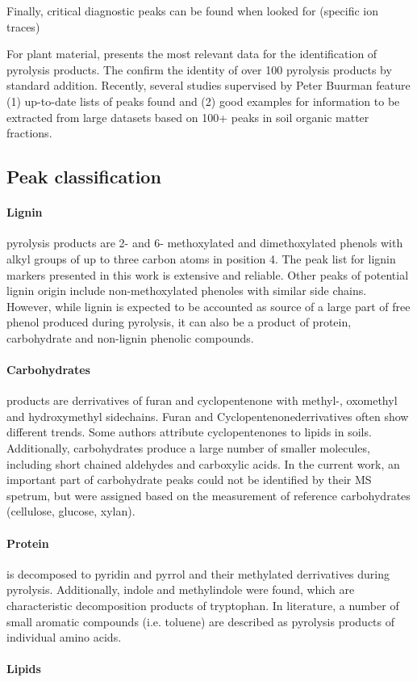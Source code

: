 Finally, critical diagnostic peaks can be found when looked for (specific ion traces)

For plant material, \cite{Ralph1991} presents the most relevant data for the identification of pyrolysis products. The confirm the identity of over 100 pyrolysis products by standard addition. Recently, several studies supervised by Peter Buurman \citep{Schellekens2009,Buurman2010, Vancampenhout2009 } feature (1) up-to-date lists of peaks found and (2) good examples for information to be extracted from large datasets based on 100+ peaks in soil organic matter fractions.

\subsection{Peak classification}

\paragraph{Lignin} pyrolysis products are 2- and 6- methoxylated and dimethoxylated phenols with alkyl groups of up to three carbon atoms in position 4. The peak list for lignin markers presented in this work is extensive and reliable. Other peaks of potential lignin origin include non-methoxylated phenoles with similar side chains. However, while lignin is expected to be accounted as source of a large part of free phenol produced during pyrolysis, it can also be a product of protein, carbohydrate and non-lignin phenolic compounds.

\paragraph{Carbohydrates} products are derrivatives of furan and cyclopentenone with methyl-, oxomethyl and hydroxymethyl sidechains. Furan and Cyclopentenonederrivatives often show different trends. Some authors attribute cyclopentenones to lipids in soils. Additionally, carbohydrates produce a large number of smaller molecules, including short chained aldehydes and carboxylic acids. In the current work, an important part of carbohydrate peaks could not be identified by their MS spetrum, but were assigned based on the measurement of reference carbohydrates (cellulose, glucose, xylan).

\paragraph{Protein} is decomposed to pyridin and pyrrol and their methylated derrivatives during pyrolysis. Additionally, indole and methylindole were found, which are characteristic decomposition products of tryptophan. In literature, a number of small aromatic compounds (i.e. toluene) are described as pyrolysis products of individual amino acids. 

\paragraph{Lipids}